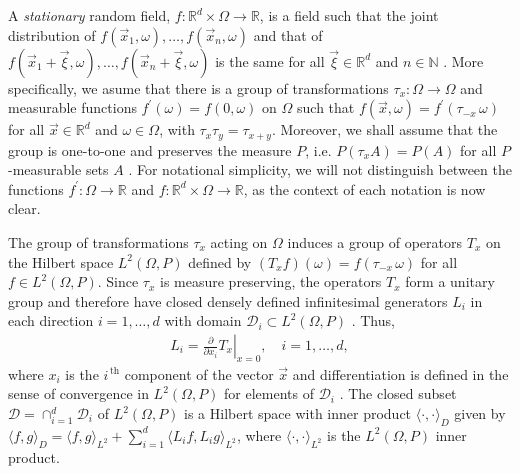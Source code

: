 \documentclass{cmslatex}
\begin{document}
A \emph{stationary} random field, $f:\mathbb{R}^d\times\Omega\to\mathbb{R}$, is a
field such that the  
joint distribution of $f(\vec{x}_1,\omega),\ldots,f(\vec{x}_n,\omega)$ and that of
$f(\vec{x}_1+\vec{\xi},\omega),\ldots,f(\vec{x}_n+\vec{\xi},\omega)$ is the same for all
$\vec{\xi}\in\mathbb{R}^d$ and $n\in\mathbb{N}$
\cite{Golden:CMP-473,Papanicolaou:RF-835}.
More specifically, we asume that there is a group of transformations
$\tau_x:\Omega\to\Omega$ and measurable functions $f^{\prime}(\omega)=f(0,\omega)$ on $\Omega$ such that
$f(\vec{x},\omega)=f^\prime(\tau_{-x}\,\omega)$ for all $\vec{x}\in\mathbb{R}^d$ and
$\omega\in\Omega$, with $\tau_x\tau_y=\tau_{x+y}$.  Moreover, we shall assume that the
group is one-to-one and preserves the measure $P$, i.e. $P(\tau_xA)=P(A)$
for all $P$-measurable sets $A$
\cite{Golden:CMP-473,Papanicolaou:RF-835}. For notational simplicity,
we will not distinguish between the functions $f^\prime:\Omega\to\mathbb{R}$ and
$f:\mathbb{R}^d\times\Omega\to\mathbb{R}$, as the context of each notation is now
clear. 






The group of transformations $\tau_x$ acting on $\Omega$ induces a group of
operators $T_x$ on the Hilbert space $L^2(\Omega,P)$ defined by
$(T_xf)(\omega)=f(\tau_{-x}\,\omega)$ for all $f\in L^2(\Omega,P)$. Since $\tau_x$ is measure
preserving, the operators $T_x$ form a unitary group and therefore
have closed densely defined infinitesimal generators $L_i$ in each
direction $i=1,\ldots,d$ with domain $\mathscr{D}_i\subset L^2(\Omega,P)$
\cite{Golden:CMP-473,Papanicolaou:RF-835}. Thus,  
%
\begin{align}\label{eq:Li}
  L_i=\left.\frac{\partial}{\partial x_i}T_x \right|_{x=0}, \quad i=1,\ldots,d,
\end{align}
%
where $x_i$
is the $i^{\,\text{th}}$ component of the vector
$\vec{x}$ and differentiation is defined in the sense of convergence
in $L^2(\Omega,P)$ for elements of $\mathscr{D}_i$
\cite{Golden:CMP-473}. The closed subset
$\mathscr{D}=\cap_{i=1}^d\mathscr{D}_i$ of $L^2(\Omega,P)$ is a Hilbert space
\cite{Golden:CMP-473} with inner product $\langle \cdot,\cdot\rangle_D$ given by  $\langle
f,g\rangle_D=\langle f,g\rangle_{L^2}+\sum_{i=1}^d\langle L_if,L_ig\rangle_{L^2}$, where $\langle\cdot,\cdot\rangle_{L^2}$
is the $L^2(\Omega,P)$ inner product. 
\end{document}
